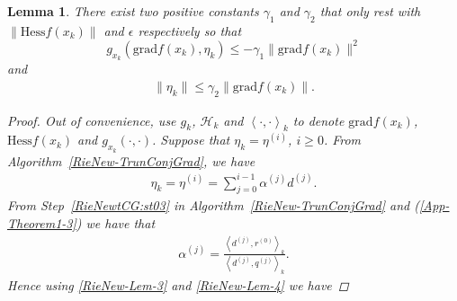 \documentclass[11pt]{article}
\newtheorem{lemma}{Lemma}[section]
\numberwithin{equation}{section}
\begin{document}
\begin{lemma} \label{RieNew-DescentDir}
There exist two positive constants $\gamma_1$ and $\gamma_2$ that only rest with $\|\mathrm{Hess}f(x_k)\|$ and $\epsilon$ respectively so that 
\begin{equation}
  g_{x_k}(\mathrm{grad}f(x_k),\eta_k) \le -\gamma_1 \|\mathrm{grad}f(x_k)\|^2 \label{RieNew-Lem-1}
\end{equation}
and
\begin{equation}
  \begin{aligned}
     \|\eta_k\|\le \gamma_2 \|\mathrm{grad}f(x_k)\|. \label{RieNew-Lem-2}
  \end{aligned}
\end{equation}  

\begin{proof} %
  Out of convenience, use $g_k$, $\mathcal{H}_k$ and $\left<\cdot,\cdot\right>_k$ to denote $\mathrm{grad}f(x_k)$, $\mathrm{Hess}f(x_k)$ and $g_{x_k}(\cdot,\cdot)$. Suppose that $\eta_k=\eta^{(i)}$, $i\ge0$. From  Algorithm~\ref{RieNew-TrunConjGrad}, we have 
\begin{align}
	\eta_k = \eta^{(i)} = \sum_{j=0}^{i-1}\alpha^{(j)}d^{(j)}. \label{RieNew-Lem-3}
\end{align}
From Step~\ref{RieNewtCG:st03} in Algorithm~\ref{RieNew-TrunConjGrad} and (\ref{App-Theorem1-3}) we have that 
\begin{align}
  \alpha^{(j)} = \frac{ \left< d^{(j)}, r^{(0)} \right>_k }{ \left< d^{(j)},q^{(j)} \right>_k }. \label{RieNew-Lem-4}
\end{align} 
Hence using \eqref{RieNew-Lem-3} and \eqref{RieNew-Lem-4} we have 


\end{proof}
\end{lemma}
\end{document}
